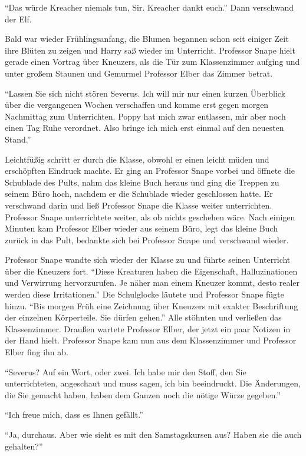 \enquote{Das würde Kreacher niemals tun, Sir. Kreacher dankt euch.} Dann verschwand der Elf.

\trenn

Bald war wieder Frühlingsanfang, die Blumen begannen schon seit einiger Zeit ihre Blüten zu zeigen und Harry saß wieder im Unterricht. Professor Snape hielt gerade einen Vortrag über Kneuzers, als die Tür zum Klassenzimmer aufging und unter großem Staunen und Gemurmel Professor Elber das Zimmer betrat.

\enquote{Lassen Sie sich nicht stören Severus. Ich will mir nur einen kurzen Überblick über die vergangenen Wochen verschaffen und komme erst gegen morgen Nachmittag zum Unterrichten. Poppy hat mich zwar entlassen, mir aber noch einen Tag Ruhe verordnet. Also bringe ich mich erst einmal auf den neuesten Stand.}

Leichtfüßig schritt er durch die Klasse, obwohl er einen leicht müden und erschöpften Eindruck machte. Er ging an Professor Snape vorbei und öffnete die Schublade des Pults, nahm das kleine Buch heraus und ging die Treppen zu seinem Büro hoch, nachdem er die Schublade wieder geschlossen hatte. Er verschwand darin und ließ Professor Snape die Klasse weiter unterrichten. Professor Snape unterrichtete weiter, als ob nichts geschehen wäre. Nach einigen Minuten kam Professor Elber wieder aus seinem Büro, legt das kleine Buch zurück in das Pult, bedankte sich bei Professor Snape und verschwand wieder.

Professor Snape wandte sich wieder der Klasse zu und führte seinen Unterricht über die Kneuzers fort. \enquote{Diese Kreaturen haben die Eigenschaft, Halluzinationen und Verwirrung hervorzurufen. Je näher man einem Kneuzer kommt, desto realer werden diese Irritationen.} Die Schulglocke läutete und Professor Snape fügte hinzu. \enquote{Bis morgen Früh eine Zeichnung über Kneuzers mit exakter Beschriftung der einzelnen Körperteile. Sie dürfen gehen.} Alle stöhnten und verließen das Klassenzimmer. Draußen wartete Professor Elber, der jetzt ein paar Notizen in der Hand hielt. Professor Snape kam nun aus dem Klassenzimmer und Professor Elber fing ihn ab.

\enquote{Severus? Auf ein Wort, oder zwei. Ich habe mir den Stoff, den Sie unterrichteten, angeschaut und muss sagen, ich bin beeindruckt. Die Änderungen, die Sie gemacht haben, haben dem Ganzen noch die nötige Würze gegeben.}

\enquote{Ich freue mich, dass es Ihnen gefällt.}

\enquote{Ja, durchaus. Aber wie sieht es mit den Samstagskursen aus? Haben sie die auch gehalten?}

